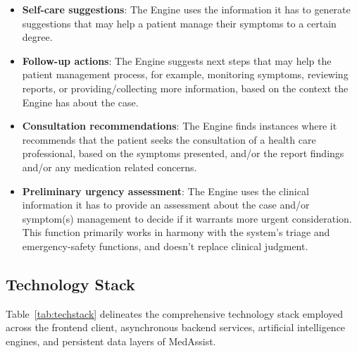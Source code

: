 \documentclass[conference]{IEEEtran}
\begin{document}
\begin{itemize}
\item \textbf{Self-care suggestions}: The Engine uses the information it has to generate suggestions that may help a patient manage their symptoms to a certain degree.

\item \textbf{Follow-up actions}: The Engine suggests next steps that may help the patient management process, for example, monitoring symptoms, reviewing reports, or providing/collecting more information, based on the context the Engine has about the case.

\item \textbf{Consultation recommendations}: The Engine finds instances where it recommends that the patient seeks the consultation of a health care professional, based on the symptoms presented, and/or the report findings and/or any medication related concerns.

\item \textbf{Preliminary urgency assessment}: The Engine uses the clinical information it has to provide an assessment about the case and/or symptom(s) management to decide if it warrants more urgent consideration. This function primarily works in harmony with the system’s triage and emergency-safety functions, and doesn’t replace clinical judgment.
\end{itemize}

\subsection{Technology Stack}

Table~\ref{tab:techstack} delineates the comprehensive technology stack employed across the frontend client, asynchronous backend services, artificial intelligence engines, and persistent data layers of MedAssist.
\end{document}
